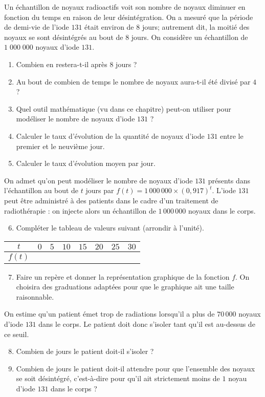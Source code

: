 \documentclass[11pt]{article}
\begin{document}
Un échantillon de noyaux radioactifs voit son nombre de noyaux diminuer en
fonction du temps en raison de leur désintégration. On a mesuré que la période
de demi-vie de l'iode $131$ était environ de $8$ jours; autrement dit, la moitié
des noyaux se sont désintégrés au bout de $8$ jours. On considère un échantillon
de $1\;000\;000$ noyaux d'iode $131$.
\begin{enumerate}
  \item Combien en restera-t-il après $8$ jours ? 
  \item Au bout de combien de temps le nombre de noyaux aura-t-il été divisé par
    $4$ ?
  \item Quel outil mathématique (vu dans ce chapitre) peut-on utiliser pour
    modéliser le nombre de noyaux d'iode $131$ ?
  \item Calculer le taux d'évolution de la quantité de noyaux d'iode $131$ entre
    le premier et le neuvième jour.
  \item Calculer le taux d'évolution moyen par jour.
\end{enumerate}
On admet qu'on peut modéliser le nombre de noyaux d'iode $131$ présents dans
l'échantillon au bout de $t$ jours par $f(t)=1\,000\,000\times (0,917)^t$.
L'iode $131$ peut être administré à des patients dans le cadre d'un traitement
de radiothérapie : on injecte alors un échantillon de $1\,000\,000$ noyaux dans
le corps.
\begin{enumerate}
  \setcounter{enumi}{5}
  \item Compléter le tableau de valeurs suivant (arrondir à l'unité).
\end{enumerate}
\begin{tabularx}{\textwidth}{|c|>{\centering}X|>{\centering}X|>{\centering}X|>{\centering}X|>{\centering}X|>{\centering}X|>{\centering\arraybackslash}X|}
    \hline
     $t$ & $0$ & $5$ & $10$ & $15$ & $20$ & $25$ & $30$ \\ 
    \hline
     $f(t)$ & & & & & & & \\
   \hline
\end{tabularx}
\begin{enumerate}
    \setcounter{enumi}{6}
  \item Faire un repère et donner la représentation graphique de la fonction
    $f$. On choisira des graduations adaptées pour que le graphique ait une
    taille raisonnable.
\end{enumerate}
On estime qu'un patient émet trop de radiations lorsqu'il a plus de
$70\,000$ noyaux d'iode $131$ dans le corps. Le patient doit donc s'isoler tant
qu'il est au-dessus de ce seuil.
\begin{enumerate}
    \setcounter{enumi}{7}
  \item Combien de jours le patient doit-il s'isoler ?
  \item Combien de jours le patient doit-il attendre pour que l'ensemble des
    noyaux se soit désintégré, c'est-à-dire pour qu'il ait strictement moins de
    $1$ noyau d'iode $131$ dans le corps ?
\end{enumerate}
\end{document}
